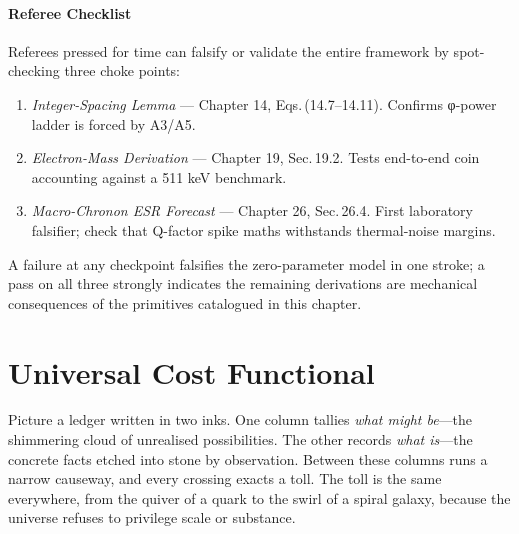\documentclass[11pt,oneside]{book}
\begin{document}
\subsubsection{Referee Checklist}
\label{subsubsec:referee-check}
Referees pressed for time can falsify or validate the entire framework by
spot-checking three choke points:

\begin{enumerate}[leftmargin=2.0em,label=\textbf{\arabic*.}]
  \item \emph{Integer-Spacing Lemma} — Chapter 14, Eqs.\,(14.7–14.11).  
        Confirms φ-power ladder is forced by A3/A5.
  \item \emph{Electron-Mass Derivation} — Chapter 19, Sec.\,19.2.  
        Tests end-to-end coin accounting against a 511 keV benchmark.
  \item \emph{Macro-Chronon ESR Forecast} — Chapter 26, Sec.\,26.4.  
        First laboratory falsifier; check that Q-factor spike maths withstands
        thermal-noise margins.
\end{enumerate}

A failure at any checkpoint falsifies the zero-parameter model in one stroke;
a pass on all three strongly indicates the remaining derivations are
mechanical consequences of the primitives catalogued in this chapter.


















\chapter{Universal Cost Functional}
\label{sec:universal-cost}

\noindent
Picture a ledger written in two inks.  
One column tallies \emph{what might be}—the shimmering cloud of unrealised possibilities.  
The other records \emph{what is}—the concrete facts etched into stone by observation.  
Between these columns runs a narrow causeway, and every crossing exacts a toll.  
The toll is the same everywhere, from the quiver of a quark to the swirl of a spiral galaxy, because the universe refuses to privilege scale or substance.  
\end{document}
